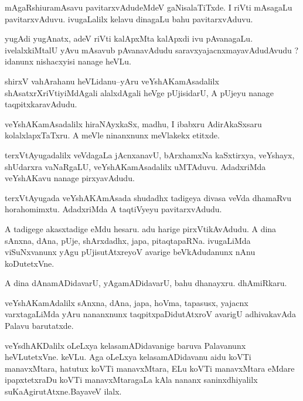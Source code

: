 \documentclass{article}
\begin{document}
\begin{mn}%
mAgaRshiuramAsavu pavitarxvAdudeMdeV gaNisalaTiTxde. I riVti mAsagaLu pavitarxvAduvu. 
ivugaLalilx kelavu dinagaLu bahu pavitarxvAduvu.
\end{mn}

\begin{mn}%
yugAdi yugAnatx, adeV riVti kalApxMta kalApxdi ivu  pAvanagaLu. ivelalxkiMtalU yAvu 
mAsavub pAvanavAdudu saravxyajacnxmayavAdudAvudu ? idanunx nishacxyisi nanage heVLu.
\end{mn}

\begin{mn}%
shirxV vahArahanu heVLidanu--yAru veYshAKamAsadalilx shAsatxrXriVtiyiMdAgali alalxdAgali 
heVge pUjisidarU, A pUjeyu nanage taqpitxkaravAdudu.
\end{mn}

\begin{mn}%
veYshAKamAsadalilx hiraNAyxkaSx, madhu, I ibabxru AdirAkaSxsaru kolalxlapxTaTxru. A meVle 
ninanxnunx meVlakekx etitxde.
\end{mn}

\begin{mn}%
terxVtAyugadalilx veVdagaLa jAcnxanavU, bArxhamxNa kaSxtirxya, veYshayx, shUdarxra 
vaNaRgaLU, veYshAKamAsadalilx uMTAduvu. AdadxriMda veYshAKavu nanage pirxyavAdudu.
\end{mn}

\begin{mn}%
terxVtAyugada veYshAKAmAsada shudadhx tadigeya divasa veVda dhamaRvu horahomimxtu. 
AdadxriMda A taqtiVyeyu pavitarxvAdudu.
\end{mn}

\begin{mn}%
A tadigege akasxtadige eMdu hesaru. adu harige pirxVtikAvAdudu. A dina sAnxna, dAna, pUje, 
shArxdadhx, japa, pitaqtapaRNa. ivugaLiMda viSuNxvanunx yAgu pUjisutAtxreyoV avarige 
beVkAdudanunx nAnu koDutetxVne.
\end{mn}

\begin{mn}%
A dina dAnamADidavarU, yAgamADidavarU, bahu dhanayxru. dhAmiRkaru.
\end{mn}

\begin{mn}%
veYshAKamAdalilx sAnxna, dAna, japa, hoVma, tapasusx, yajacnx varxtagaLiMda yAru 
nananxnunx taqpitxpaDidutAtxroV avarigU adhivakavAda Palavu barutatxde.
\end{mn}

\begin{mn}%
veYsdhAKDalilx oLeLxya kelasamADidavanige baruva Palavanunx heVLutetxVne. keVLu. Aga 
oLeLxya kelasamADidavanu aidu koVTi manavxMtara, hatutux koVTi manavxMtara, ELu koVTi 
manavxMtara eMdare ipapxtetxraDu koVTi manavxMtaragaLa kAla nananx saninxdhiyalilx 
suKaAgirutAtxne.BayaveV ilalx.
\end{mn}
\end{document}
